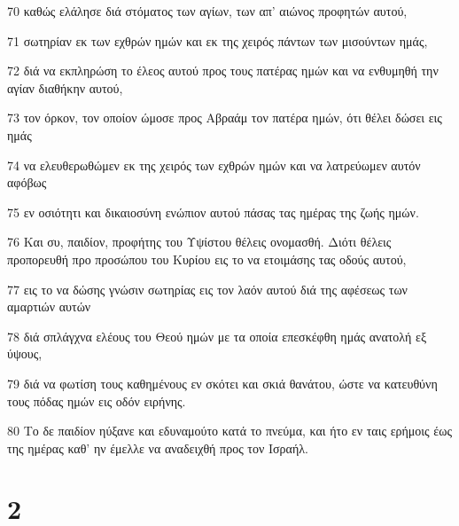 \par 70 καθώς ελάλησε διά στόματος των αγίων, των απ' αιώνος προφητών αυτού,
\par 71 σωτηρίαν εκ των εχθρών ημών και εκ της χειρός πάντων των μισούντων ημάς,
\par 72 διά να εκπληρώση το έλεος αυτού προς τους πατέρας ημών και να ενθυμηθή την αγίαν διαθήκην αυτού,
\par 73 τον όρκον, τον οποίον ώμοσε προς Αβραάμ τον πατέρα ημών, ότι θέλει δώσει εις ημάς
\par 74 να ελευθερωθώμεν εκ της χειρός των εχθρών ημών και να λατρεύωμεν αυτόν αφόβως
\par 75 εν οσιότητι και δικαιοσύνη ενώπιον αυτού πάσας τας ημέρας της ζωής ημών.
\par 76 Και συ, παιδίον, προφήτης του Υψίστου θέλεις ονομασθή. Διότι θέλεις προπορευθή προ προσώπου του Κυρίου εις το να ετοιμάσης τας οδούς αυτού,
\par 77 εις το να δώσης γνώσιν σωτηρίας εις τον λαόν αυτού διά της αφέσεως των αμαρτιών αυτών
\par 78 διά σπλάγχνα ελέους του Θεού ημών με τα οποία επεσκέφθη ημάς ανατολή εξ ύψους,
\par 79 διά να φωτίση τους καθημένους εν σκότει και σκιά θανάτου, ώστε να κατευθύνη τους πόδας ημών εις οδόν ειρήνης.
\par 80 Το δε παιδίον ηύξανε και εδυναμούτο κατά το πνεύμα, και ήτο εν ταις ερήμοις έως της ημέρας καθ' ην έμελλε να αναδειχθή προς τον Ισραήλ.

\chapter{2}


